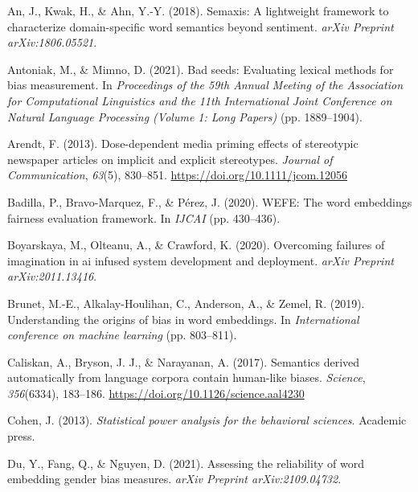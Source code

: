 \documentclass[english,man,mask]{apa6}
\begin{document}
\begingroup
\setlength{\parindent}{-0.5in}
\setlength{\leftskip}{0.5in}

\hypertarget{refs}{}
\leavevmode\hypertarget{ref-an2018semaxis}{}%
An, J., Kwak, H., \& Ahn, Y.-Y. (2018). Semaxis: A lightweight framework to characterize domain-specific word semantics beyond sentiment. \emph{arXiv Preprint arXiv:1806.05521}.

\leavevmode\hypertarget{ref-antoniak2021bad}{}%
Antoniak, M., \& Mimno, D. (2021). Bad seeds: Evaluating lexical methods for bias measurement. In \emph{Proceedings of the 59th Annual Meeting of the Association for Computational Linguistics and the 11th International Joint Conference on Natural Language Processing (Volume 1: Long Papers)} (pp. 1889--1904).

\leavevmode\hypertarget{ref-arendt:2013:DDM}{}%
Arendt, F. (2013). Dose-dependent media priming effects of stereotypic newspaper articles on implicit and explicit stereotypes. \emph{Journal of Communication}, \emph{63}(5), 830--851. \url{https://doi.org/10.1111/jcom.12056}

\leavevmode\hypertarget{ref-badilla2020wefe}{}%
Badilla, P., Bravo-Marquez, F., \& Pérez, J. (2020). WEFE: The word embeddings fairness evaluation framework. In \emph{IJCAI} (pp. 430--436).

\leavevmode\hypertarget{ref-boyarskaya2020overcoming}{}%
Boyarskaya, M., Olteanu, A., \& Crawford, K. (2020). Overcoming failures of imagination in ai infused system development and deployment. \emph{arXiv Preprint arXiv:2011.13416}.

\leavevmode\hypertarget{ref-brunet2019understanding}{}%
Brunet, M.-E., Alkalay-Houlihan, C., Anderson, A., \& Zemel, R. (2019). Understanding the origins of bias in word embeddings. In \emph{International conference on machine learning} (pp. 803--811).

\leavevmode\hypertarget{ref-caliskan:2017:S}{}%
Caliskan, A., Bryson, J. J., \& Narayanan, A. (2017). Semantics derived automatically from language corpora contain human-like biases. \emph{Science}, \emph{356}(6334), 183--186. \url{https://doi.org/10.1126/science.aal4230}

\leavevmode\hypertarget{ref-cohen2013statistical}{}%
Cohen, J. (2013). \emph{Statistical power analysis for the behavioral sciences}. Academic press.

\leavevmode\hypertarget{ref-du2021assessing}{}%
Du, Y., Fang, Q., \& Nguyen, D. (2021). Assessing the reliability of word embedding gender bias measures. \emph{arXiv Preprint arXiv:2109.04732}.
\end{document}
